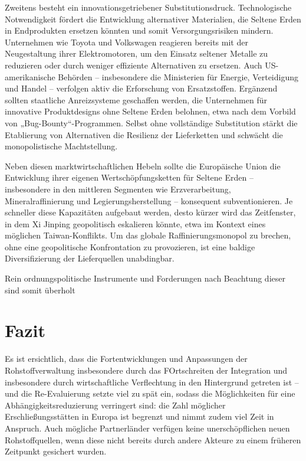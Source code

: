 \documentclass[12pt,a4paper,oneside]{book} %
\begin{document}
Zweitens besteht ein innovationsgetriebener Substitutionsdruck. Technologische Notwendigkeit fördert die Entwicklung alternativer Materialien, die Seltene Erden in Endprodukten ersetzen könnten und somit Versorgungsrisiken mindern. Unternehmen wie Toyota und Volkswagen reagieren bereits mit der Neugestaltung ihrer Elektromotoren, um den Einsatz seltener Metalle zu reduzieren oder durch weniger effiziente Alternativen zu ersetzen. Auch US-amerikanische Behörden – insbesondere die Ministerien für Energie, Verteidigung und Handel – verfolgen aktiv die Erforschung von Ersatzstoffen. Ergänzend sollten staatliche Anreizsysteme geschaffen werden, die Unternehmen für innovative Produktdesigns ohne Seltene Erden belohnen, etwa nach dem Vorbild von „Bug-Bounty“-Programmen. Selbst ohne vollständige Substitution stärkt die Etablierung von Alternativen die Resilienz der Lieferketten und schwächt die monopolistische Machtstellung.

Neben diesen marktwirtschaftlichen Hebeln sollte die Europäische Union die Entwicklung ihrer eigenen Wertschöpfungsketten für Seltene Erden – insbesondere in den mittleren Segmenten wie Erzverarbeitung, Mineralraffinierung und Legierungsherstellung – konsequent subventionieren. Je schneller diese Kapazitäten aufgebaut werden, desto kürzer wird das Zeitfenster, in dem Xi Jinping geopolitisch eskalieren könnte, etwa im Kontext eines möglichen Taiwan-Konflikts. Um das globale Raffinierungsmonopol zu brechen, ohne eine geopolitische Konfrontation zu provozieren, ist eine baldige Diversifizierung der Lieferquellen unabdingbar.

Rein ordnungspolitische Instrumente und Forderungen nach Beachtung dieser sind somit überholt

\section{Fazit}

Es ist ersichtlich, dass die Fortentwicklungen und Anpassungen der Rohstoffverwaltung insbesondere durch das FOrtschreiten der Integration und insbesondere durch wirtschaftliche Verflechtung in den Hintergrund getreten ist -- und die Re-Evaluierung setzte viel zu spät ein, sodass die Möglichkeiten für eine Abhängigkeitsreduzierung verringert sind: die Zahl möglicher Erschließungsstätten in Europa ist begrenzt und nimmt zudem viel Zeit in Anspruch. Auch mögliche Partnerländer verfügen keine unerschöpflichen neuen Rohstoffquellen, wenn diese nicht bereits durch andere Akteure zu einem früheren Zeitpunkt gesichert wurden.
\end{document}
